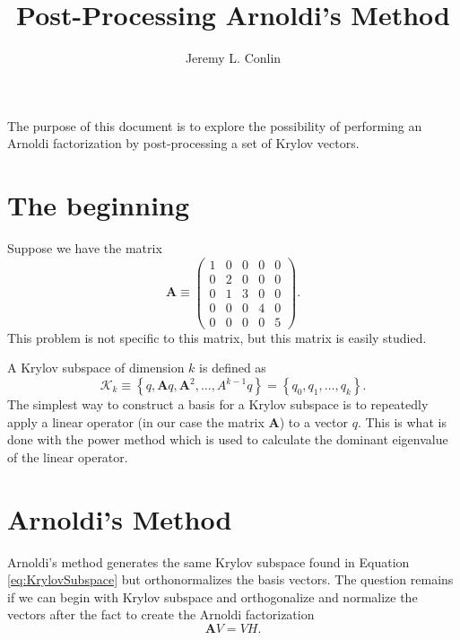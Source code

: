 \documentclass[12pt]{article}
\title{Post-Processing Arnoldi's Method}
\author{Jeremy L. Conlin}
\newcommand{\A}{\mathbf{A}}
\begin{document}
\maketitle

The purpose of this document is to explore the possibility of performing an Arnoldi factorization by post-processing a set of Krylov vectors.

\section{The beginning}
Suppose we have the matrix
\begin{equation*}
    \A \equiv \begin{pmatrix} 1 & 0 & 0 & 0 & 0 \\
                              0 & 2 & 0 & 0 & 0 \\
                              0 & 1 & 3 & 0 & 0 \\
                              0 & 0 & 0 & 4 & 0 \\
                              0 & 0 & 0 & 0 & 5 \end{pmatrix}.
\end{equation*}
This problem is not specific to this matrix, but this matrix is easily studied.

A Krylov subspace of dimension $k$ is defined as 
\begin{equation}
    \mathcal{K}_k \equiv \left\{q, \A q, \A^2, \ldots, A^{k-1}q\right\} = \left\{q_0, q_1, \ldots, q_k\right\}.
    \label{eq:KrylovSubspace}
\end{equation}
The simplest way to construct a basis for a Krylov subspace is to repeatedly apply a linear operator (in our case the matrix $\A$) to a vector $q$.  This is what is done with the power method which is used to calculate the dominant eigenvalue of the linear operator.  

\section{Arnoldi's Method}
Arnoldi's method generates the same Krylov subspace found in Equation \ref{eq:KrylovSubspace} but orthonormalizes the basis vectors.  The question remains if we can begin with Krylov subspace and orthogonalize and normalize the vectors after the fact to create the Arnoldi factorization
\begin{equation}
    \A V = V H.
    \label{eq:ArnoldiFactorization}
\end{equation}
\end{document}
